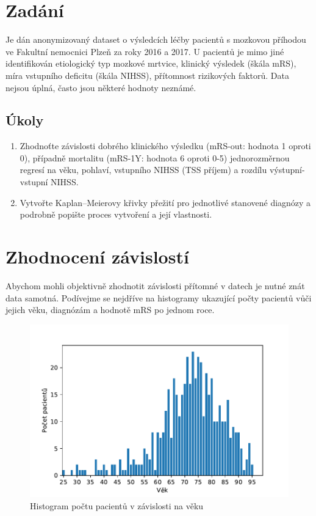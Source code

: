 \section{Zadání}

Je dán anonymizovaný dataset o výsledcích léčby pacientů s mozkovou příhodou ve Fakultní nemocnici Plzeň za roky 2016 a 2017.
U pacientů je mimo jiné identifikován etiologický typ mozkové mrtvice, klinický výsledek (škála mRS), míra vstupního deficitu (škála NIHSS), přítomnost rizikových faktorů.
Data nejsou úplná, často jsou některé hodnoty neznámé.

\subsection{Úkoly}

\begin{enumerate}
    \item Zhodnoťte závislosti dobrého klinického výsledku (mRS-out: hodnota 1 oproti 0), případně mortalitu (mRS-1Y: hodnota 6 oproti 0-5) jednorozměrnou regresí na věku, pohlaví, vstupního NIHSS (TSS příjem) a rozdílu výstupní-vstupní NIHSS.
    \item Vytvořte Kaplan–Meierovy křivky přežití pro jednotlivé stanovené diagnózy a podrobně popište proces vytvoření a její vlastnosti.
\end{enumerate}

\section{Zhodnocení závislostí}

Abychom mohli objektivně zhodnotit závislosti přítomné v datech je nutné znát data samotná.
Podívejme se nejdříve na histogramy ukazující počty pacientů vůči jejich věku, diagnózám a hodnotě mRS po jednom roce.

\begin{figure}[htbp]
    \includegraphics[width=.6\textwidth]{img/image_0.pdf}
    \centering
    \caption{Histogram počtu pacientů v závislosti na věku}
    \label{img:age-histogram}
\end{figure}
\FloatBarrier

